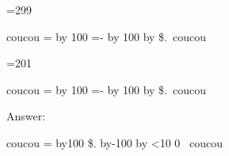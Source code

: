 \def\dollaramount{ \count1=\count0
\divide\count1 by 100
\count2=-\count1
\multiply\count2 by 100
\advance\count2 by \count0
\$\the{}.\the{}}
=299


coucou \dollaramount\ coucou

=201

coucou \dollaramount\ coucou

Answer:

\def\dollaramount{=\count0 \divide\count2 by100
\$\number\count2.%
\multiply\count2 by-100 \advance\count2 by
\ifnum \count2<10 0\fi
\number{} }


coucou \dollaramount\ coucou


\bye


